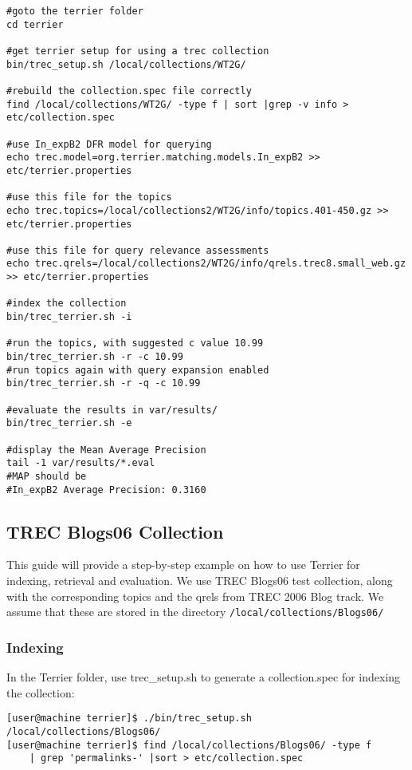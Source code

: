 \begin{verbatim}
#goto the terrier folder
cd terrier

#get terrier setup for using a trec collection
bin/trec_setup.sh /local/collections/WT2G/

#rebuild the collection.spec file correctly
find /local/collections/WT2G/ -type f | sort |grep -v info > etc/collection.spec

#use In_expB2 DFR model for querying
echo trec.model=org.terrier.matching.models.In_expB2 >> etc/terrier.properties

#use this file for the topics
echo trec.topics=/local/collections2/WT2G/info/topics.401-450.gz >> etc/terrier.properties

#use this file for query relevance assessments
echo trec.qrels=/local/collections2/WT2G/info/qrels.trec8.small_web.gz >> etc/terrier.properties

#index the collection
bin/trec_terrier.sh -i

#run the topics, with suggested c value 10.99 
bin/trec_terrier.sh -r -c 10.99
#run topics again with query expansion enabled
bin/trec_terrier.sh -r -q -c 10.99

#evaluate the results in var/results/
bin/trec_terrier.sh -e

#display the Mean Average Precision
tail -1 var/results/*.eval
#MAP should be 
#In_expB2 Average Precision: 0.3160 
\end{verbatim}

\subsection{TREC Blogs06 Collection}\label{trec-blogs06-collection}

This guide will provide a step-by-step example on how to use Terrier for
indexing, retrieval and evaluation. We use TREC Blogs06 test collection,
along with the corresponding topics and the qrels from TREC 2006 Blog
track. We assume that these are stored in the directory
\texttt{/local/collections/Blogs06/}

\subsubsection{Indexing}\label{indexing}

In the Terrier folder, use trec\_setup.sh to generate a collection.spec
for indexing the collection:

\begin{verbatim}
[user@machine terrier]$ ./bin/trec_setup.sh /local/collections/Blogs06/
[user@machine terrier]$ find /local/collections/Blogs06/ -type f  
    | grep 'permalinks-' |sort > etc/collection.spec
\end{verbatim}

